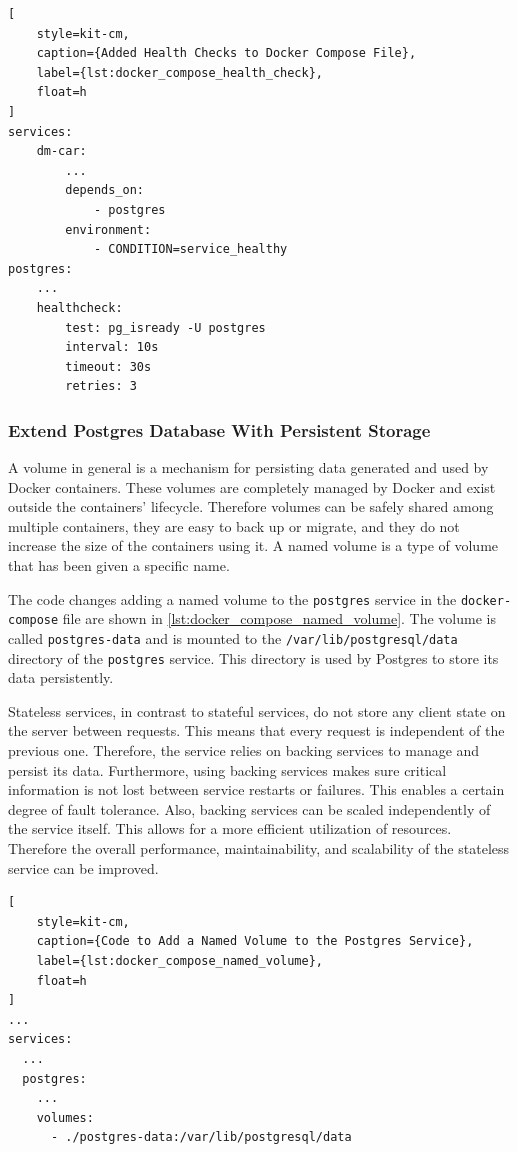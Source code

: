 

\begin{lstlisting}[
    style=kit-cm,
    caption={Added Health Checks to Docker Compose File},
    label={lst:docker_compose_health_check},
    float=h
]
services:
    dm-car:
        ...
        depends_on:
            - postgres
        environment:
            - CONDITION=service_healthy
postgres:
    ...
    healthcheck:
        test: pg_isready -U postgres
        interval: 10s
        timeout: 30s
        retries: 3
\end{lstlisting}

\subsubsection*{Extend Postgres Database With Persistent Storage}
A volume in general is a mechanism for persisting data generated and used by Docker containers.
These volumes are completely managed by Docker and exist outside the containers' lifecycle.
Therefore volumes can be safely shared among multiple containers, they are easy to back up or migrate, and they do not increase the size of the containers using it.
A named volume is a type of volume that has been given a specific name.

The code changes adding a named volume to the \texttt{postgres} service in the \texttt{docker-compose} file are shown in \autoref*{lst:docker_compose_named_volume}.
The volume is called \texttt{postgres-data} and is mounted to the \texttt{/var/lib/postgresql/data} directory of the \texttt{postgres} service.
This directory is used by Postgres to store its data persistently.

Stateless services, in contrast to stateful services, do not store any client state on the server between requests.
This means that every request is independent of the previous one.
Therefore, the service relies on backing services to manage and persist its data.
Furthermore, using backing services makes sure critical information is not lost between service restarts or failures.
This enables a certain degree of fault tolerance.
Also, backing services can be scaled independently of the service itself.
This allows for a more efficient utilization of resources.
Therefore the overall performance, maintainability, and scalability of the stateless service can be improved.

\begin{lstlisting}[
    style=kit-cm,
    caption={Code to Add a Named Volume to the Postgres Service},
    label={lst:docker_compose_named_volume},
    float=h
]
...
services:
  ...
  postgres:
    ...
    volumes:
      - ./postgres-data:/var/lib/postgresql/data
\end{lstlisting}